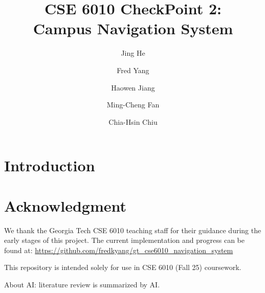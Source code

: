 \documentclass[fleqn,10pt]{olplainarticle}
\title{CSE 6010 CheckPoint 2: \\Campus Navigation System}
\author[1]{Jing He}
\author[2]{Fred Yang}
\author[3]{Haowen Jiang}
\author[4]{Ming-Cheng Fan}
\author[5]{Chia-Hsin Chiu}
\affil[1]{jhe468@gatech.edu}
\affil[2]{fred.yang@gatech.edu}
\affil[3]{hjiang401@gatech.edu}
\affil[4]{mfan77@gatech.edu}
\affil[5]{cchiu73@gatech.edu}
\begin{document}
\flushbottom
\maketitle


\section*{Introduction}


\newpage
\section*{Acknowledgment}

We thank the Georgia Tech CSE 6010 teaching staff for their guidance during the early stages of this project.  
The current implementation and progress can be found at:  
\url{https://github.com/fredkyang/gt_cse6010_navigation_system}

This repository is intended solely for use in CSE 6010 (Fall 25) coursework.

About AI: literature review is summarized by AI.


\end{document}
